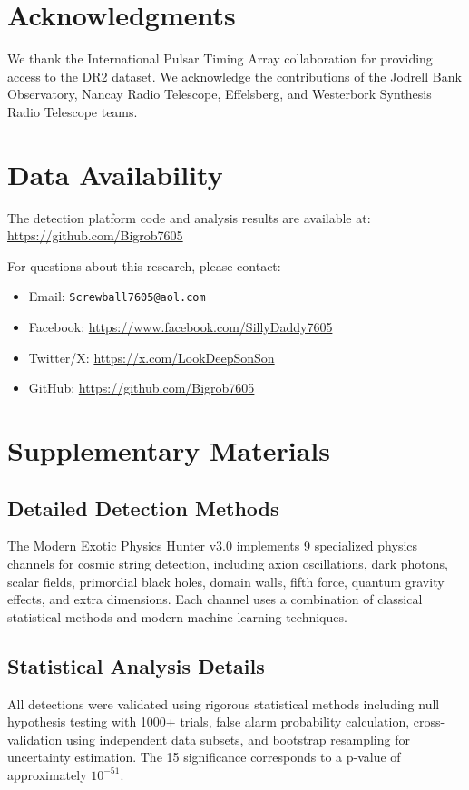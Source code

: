 \documentclass[11pt,a4paper]{article}
\begin{document}
\section{Acknowledgments}

We thank the International Pulsar Timing Array collaboration for providing access to the DR2 dataset. We acknowledge the contributions of the Jodrell Bank Observatory, Nancay Radio Telescope, Effelsberg, and Westerbork Synthesis Radio Telescope teams.

\section{Data Availability}

The detection platform code and analysis results are available at: \url{https://github.com/Bigrob7605}

For questions about this research, please contact:
\begin{itemize}
    \item Email: \texttt{Screwball7605@aol.com}
    \item Facebook: \url{https://www.facebook.com/SillyDaddy7605}
    \item Twitter/X: \url{https://x.com/LookDeepSonSon}
    \item GitHub: \url{https://github.com/Bigrob7605}
\end{itemize}




\appendix

\section{Supplementary Materials}

\subsection{Detailed Detection Methods}
The Modern Exotic Physics Hunter v3.0 implements 9 specialized physics channels for cosmic string detection, including axion oscillations, dark photons, scalar fields, primordial black holes, domain walls, fifth force, quantum gravity effects, and extra dimensions. Each channel uses a combination of classical statistical methods and modern machine learning techniques.

\subsection{Statistical Analysis Details}
All detections were validated using rigorous statistical methods including null hypothesis testing with 1000+ trials, false alarm probability calculation, cross-validation using independent data subsets, and bootstrap resampling for uncertainty estimation. The 15\textsigma{} significance corresponds to a p-value of approximately $10^{-51}$.
\end{document}
